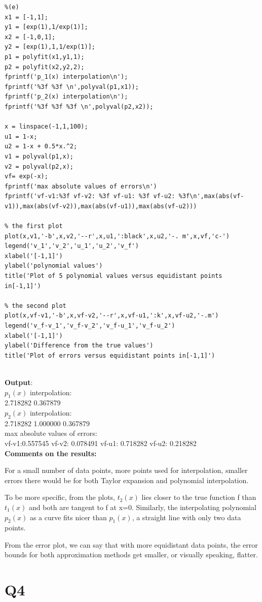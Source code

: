 \documentclass[12pt]{article}
\begin{document}
\begin{lstlisting}
%(e)
x1 = [-1,1];
y1 = [exp(1),1/exp(1)];
x2 = [-1,0,1];
y2 = [exp(1),1,1/exp(1)];
p1 = polyfit(x1,y1,1);
p2 = polyfit(x2,y2,2);
fprintf('p_1(x) interpolation\n');
fprintf('%3f %3f \n',polyval(p1,x1));
fprintf('p_2(x) interpolation\n');
fprintf('%3f %3f %3f \n',polyval(p2,x2));

x = linspace(-1,1,100);
u1 = 1-x;
u2 = 1-x + 0.5*x.^2;
v1 = polyval(p1,x);
v2 = polyval(p2,x);
vf= exp(-x);
fprintf('max absolute values of errors\n')
fprintf('vf-v1:%3f vf-v2: %3f vf-u1: %3f vf-u2: %3f\n',max(abs(vf-v1)),max(abs(vf-v2)),max(abs(vf-u1)),max(abs(vf-u2)))

% the first plot
plot(x,v1,'-b',x,v2,'--r',x,u1,':black',x,u2,'-. m',x,vf,'c-')
legend('v_1','v_2','u_1','u_2','v_f')
xlabel('[-1,1]')
ylabel('polynomial values')
title('Plot of 5 polynomial values versus equidistant points in[-1,1]')

% the second plot
plot(x,vf-v1,'-b',x,vf-v2,'--r',x,vf-u1,':k',x,vf-u2,'-.m')
legend('v_f-v_1','v_f-v_2','v_f-u_1','v_f-u_2')
xlabel('[-1,1]')
ylabel('Difference from the true values')
title('Plot of errors versus equidistant points in[-1,1]')
\end{lstlisting}\\
\textbf{Output}:\\
$p_1(x)$ interpolation:\\
2.718282 0.367879 \\
$p_2(x)$ interpolation:\\
2.718282 1.000000 0.367879\\ 
max absolute values of errors:\\
vf-v1:0.557545 vf-v2: 0.078491 vf-u1: 0.718282 vf-u2: 0.218282\\
\textbf{Comments on the results:}

For a small number of data points, more points used for interpolation, smaller errors there would be for both Taylor expansion and polynomial interpolation. 

To be more specific, from the plots, $t_2(x)$ lies closer to the true function f than $t_1(x)$ and both are tangent to f at x=0. Similarly, the interpolating polynomial $p_2(x)$ as a curve fits nicer than $p_1(x)$, a straight line with only two data points.

From the error plot, we can say that with more equidistant data points, the error bounds for both approximation methods get smaller, or visually speaking, flatter.

\section{Q4}
\end{document}
